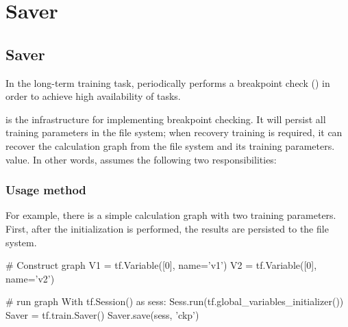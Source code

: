 \begin{savequote}[45mm]
\end{savequote}

\chapter{Saver} 
\label{ch:saver}

\section{Saver}

\begin{content}

In the long-term training task, \tf{} periodically performs a breakpoint check () in order to achieve high availability of tasks.

 is the infrastructure for implementing breakpoint checking. It will persist all training parameters in the file system; when recovery training is required, it can recover the calculation graph from the file system and its training parameters. value. In other words,  assumes the following two responsibilities:

\begin{enum}
\end{enum}

\subsection{Usage method}

For example, there is a simple calculation graph with two training parameters. First, after the initialization is performed, the results are persisted to the file system.

\begin{leftbar}
\begin{python}
# Construct graph
V1 = tf.Variable([0], name='v1')
V2 = tf.Variable([0], name='v2')

# run graph
With tf.Session() as sess:
  Sess.run(tf.global_variables_initializer())
  Saver = tf.train.Saver()
  Saver.save(sess, 'ckp')
\end{python}
\end{leftbar}


\end{content}
